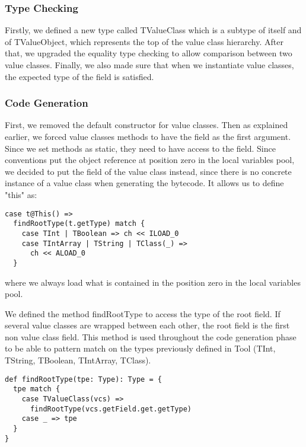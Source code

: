 \subsubsection{Type Checking}
Firstly, we defined a new type called TValueClass which is a subtype of itself and of TValueObject, which represents the top of the value class hierarchy. \newline
After that, we upgraded the equality type checking to allow comparison between two value classes. \newline
Finally, we also made sure that when we instantiate value classes, the expected type of the field is satisfied. \newline

\subsubsection{Code Generation}
First, we removed the default constructor for value classes. 
Then as explained earlier, we forced value classes methods to have the field as the first argument. 
Since we set methods as static, they need to have access to the field. \newline
Since conventions put the object reference at position zero in the local variables pool, we decided to put the field of the value class instead, since there is no concrete instance of a value class when generating the bytecode. It allows us to define "this" as:
\begin{verbatim}
case t@This() =>
  findRootType(t.getType) match {
    case TInt | TBoolean => ch << ILOAD_0
    case TIntArray | TString | TClass(_) => 
      ch << ALOAD_0
  }
\end{verbatim}
where we always load what is contained in the position zero in the local variables pool.

We defined the method findRootType to access the type of the root field. 
If several value classes are wrapped between each other, the root field is the first non value class field. 
This method is used throughout the code generation phase to be able to pattern match on the types previously defined in Tool (TInt, TString, TBoolean, TIntArray, TClass).
\begin{verbatim}
def findRootType(tpe: Type): Type = {
  tpe match {
    case TValueClass(vcs) => 
      findRootType(vcs.getField.get.getType)
    case _ => tpe
  }
}
\end{verbatim}

